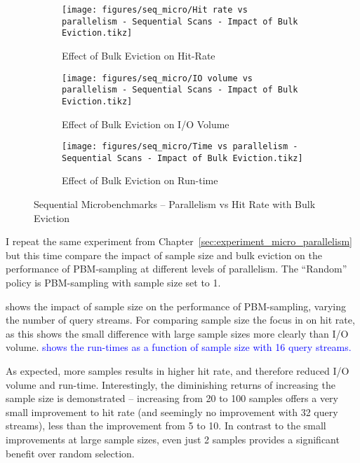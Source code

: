 \begin{figure}

\centering
    \begin{subfigure}{0.45\textwidth}
        \centering
        \texttt{[image: figures/seq\_micro/Hit rate vs parallelism - Sequential Scans - Impact of Bulk Eviction.tikz]}
        \caption{Effect of Bulk Eviction on Hit-Rate}
        \label{fig:seq_micro_parallel_hitrate_bulk}
    \end{subfigure}\hspace{0.05\textwidth}%
    \begin{subfigure}{0.45\textwidth}
        \centering
        \texttt{[image: figures/seq\_micro/IO volume vs parallelism - Sequential Scans - Impact of Bulk Eviction.tikz]}
        \caption{Effect of Bulk Eviction on I/O Volume}
        \label{fig:seq_micro_parallel_iovol_bulk}
    \end{subfigure}
    
\vspace{20pt}
    \begin{subfigure}{0.45\textwidth}
        \centering
        \texttt{[image: figures/seq\_micro/Time vs parallelism - Sequential Scans - Impact of Bulk Eviction.tikz]}
        \caption{Effect of Bulk Eviction on Run-time}
        \label{fig:seq_micro_parallel_time_bulk}
    \end{subfigure}
    \caption{Sequential Microbenchmarks -- Parallelism vs Hit Rate with Bulk Eviction}
    \label{fig:seq_micro_parallel_bulkeviction}
\end{figure}


I repeat the same experiment from Chapter~\ref{sec:experiment_micro_parallelism} but this time compare the impact of sample size and bulk eviction on the performance of PBM-sampling at different levels of parallelism. The ``Random'' policy is PBM-sampling with sample size set to 1.

 shows the impact of sample size on the performance of PBM-sampling, varying the number of query streams. For comparing sample size the focus in on hit rate, as this shows the small difference with large sample sizes more clearly than I/O volume. \textcolor{blue}{ shows the run-times as a function of sample size with 16 query streams.}

As expected, more samples results in higher hit rate, and therefore reduced I/O volume and run-time. Interestingly, the diminishing returns of increasing the sample size is demonstrated -- increasing from 20 to 100 samples offers a very small improvement to hit rate (and seemingly no improvement with 32 query streams), less than the improvement from 5 to 10. In contrast to the small improvements at large sample sizes, even just 2 samples provides a significant benefit over random selection.

